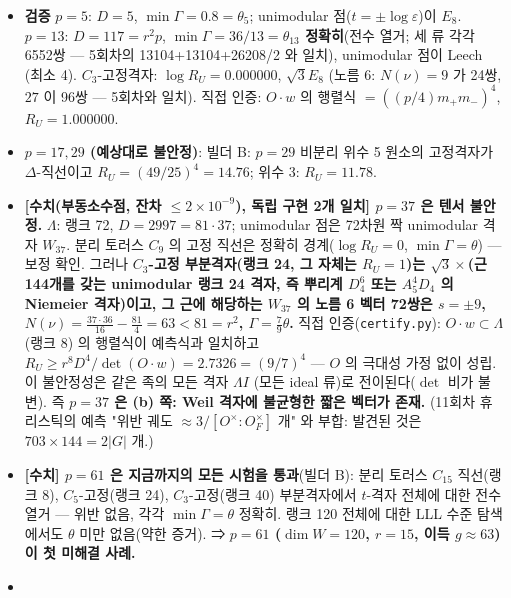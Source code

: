 \begin{itemize}
\tightlist
\item
  \textbf{검증} \(p=5\): \(D=5\), \(\min\Gamma=0.8=\theta_5\); unimodular 점(\(t=\pm\log\varepsilon\))이 \(E_8\). \(p=13\): \(D=117=r^2p\), \textbf{\(\min\Gamma=36/13=\theta_{13}\) 정확히}(전수 열거; 세 류 각각 6552쌍 --- 5회차의 13104+13104+26208/2 와 일치), unimodular 점이 Leech (최소 4). \(C_3\)-고정격자: \(\log R_U=0.000000\), \(\sqrt3E_8\) (노름 6: \(N(\nu)=9\) 가 24쌍, \(27\) 이 96쌍 --- 5회차와 일치). 직접 인증: \(O\cdot w\) 의 행렬식 \(=((p/4)m_+m_-)^4\), \(R_U=1.000000\).
\item
  \textbf{\(p=17,29\) (예상대로 불안정)}: 빌더 B: \(p=29\) 비분리 위수 5 원소의 고정격자가 \(\Delta\)-직선이고 \(R_U=(49/25)^4=14.76\); 위수 3: \(R_U=11.78\).
\item
  \textbf{{[}수치(부동소수점, 잔차 \(\le2\times10^{-9}\)), 독립 구현 2개 일치{]} \(p=37\) 은 텐서 불안정.} \(\Lambda\): 랭크 72, \(D=2997=81\cdot37\); unimodular 점은 72차원 짝 unimodular 격자 \(W_{37}\). 분리 토러스 \(C_9\) 의 고정 직선은 정확히 경계(\(\log R_U=0\), \(\min\Gamma=\theta\)) --- 보정 확인. 그러나 \textbf{\(C_3\)-고정 부분격자(랭크 24, 그 자체는 \(R_U=1\))는 \(\sqrt3\times\)(근 144개를 갖는 unimodular 랭크 24 격자, 즉 뿌리계 \(D_4^6\) 또는 \(A_5^4D_4\) 의 Niemeier 격자)이고, 그 근에 해당하는 \(W_{37}\) 의 노름 6 벡터 72쌍은 \(s=\pm9\), \(N(\nu)=\tfrac{37\cdot36}{16}-\tfrac{81}4=63<81=r^2\), \(\Gamma=\tfrac79\theta\).} 직접 인증(\texttt{certify.py}): \(O\cdot w\subset\Lambda\) (랭크 8) 의 행렬식이 예측식과 일치하고 \textbf{\(R_U\ge r^8D^4/\det(O\cdot w)=2.7326=(9/7)^4\)} --- \(O\) 의 극대성 가정 없이 성립. 이 불안정성은 같은 족의 모든 격자 \(\Lambda I\) (모든 ideal 류)로 전이된다(\(\det\) 비가 불변). 즉 \textbf{\(p=37\) 은 (b) 쪽: Weil 격자에 불균형한 짧은 벡터가 존재.} (11회차 휴리스틱의 예측 "위반 궤도 \(\approx3/[O^\times:O_F^\times]\) 개" 와 부합: 발견된 것은 \(703\times144=2|G|\) 개.)
\item
  \textbf{{[}수치{]} \(p=61\) 은 지금까지의 모든 시험을 통과}(빌더 B): 분리 토러스 \(C_{15}\) 직선(랭크 8), \(C_5\)-고정(랭크 24), \(C_3\)-고정(랭크 40) 부분격자에서 \(t\)-격자 전체에 대한 전수 열거 --- 위반 없음, 각각 \(\min\Gamma=\theta\) 정확히. 랭크 120 전체에 대한 LLL 수준 탐색에서도 \(\theta\) 미만 없음(약한 증거). ⇒ \textbf{\(p=61\) (\(\dim W=120\), \(r=15\), 이득 \(g\approx63\)) 이 첫 미해결 사례.}
\item

\end{itemize}

